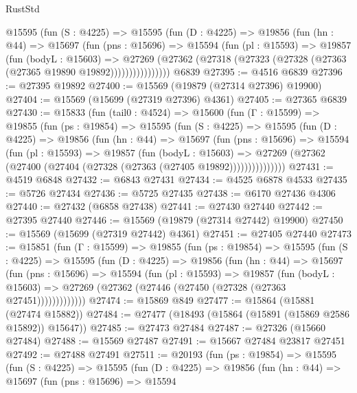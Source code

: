 \begin{lexlean}{RustStd}
\begin{coremodule}
          @15595
            (fun (S : @4225) =>
            @15595
              (fun (D : @4225) =>
              @19856
                (fun (hn : @44) =>
                @15697
                  (fun (pns : @15696) =>
                  @15594
                    (fun (pl : @15593) =>
                    @19857
                      (fun (bodyL : @15603) =>
                      @27269
                        (@27362
                          (@27318 (@27323 (@27328 (@27363 (@27365 @19890 @19892))))))))))))))))
    @6839
@27395 := @4516 @6839
@27396 := @27395 @19892
@27400 := @15569 (@19879 (@27314 @27396) @19900)
@27404 := @15569 (@15699 (@27319 @27396) @4361)
@27405 := @27365 @6839
@27430 := @15833
    (fun (tail0 : @4524) =>
    @15600
      (fun (Γ : @15599) =>
      @19855
        (fun (ps : @19854) =>
        @15595
          (fun (S : @4225) =>
          @15595
            (fun (D : @4225) =>
            @19856
              (fun (hn : @44) =>
              @15697
                (fun (pns : @15696) =>
                @15594
                  (fun (pl : @15593) =>
                  @19857
                    (fun (bodyL : @15603) =>
                    @27269 (@27362 (@27400 (@27404 (@27328 (@27363 (@27405 @19892)))))))))))))))
@27431 := @4519 @6848
@27432 := @6843 @27431
@27434 := @4525 @6878 @4533
@27435 := @5726 @27434
@27436 := @5725 @27435
@27438 := @6170 @27436 @4306
@27440 := @27432 (@6858 @27438)
@27441 := @27430 @27440
@27442 := @27395 @27440
@27446 := @15569 (@19879 (@27314 @27442) @19900)
@27450 := @15569 (@15699 (@27319 @27442) @4361)
@27451 := @27405 @27440
@27473 := @15851
    (fun (Γ : @15599) =>
    @19855
      (fun (ps : @19854) =>
      @15595
        (fun (S : @4225) =>
        @15595
          (fun (D : @4225) =>
          @19856
            (fun (hn : @44) =>
            @15697
              (fun (pns : @15696) =>
              @15594
                (fun (pl : @15593) =>
                @19857
                  (fun (bodyL : @15603) =>
                  @27269 (@27362 (@27446 (@27450 (@27328 (@27363 @27451)))))))))))))
@27474 := @15869 @849
@27477 := @15864 (@15881 (@27474 @15882))
@27484 := @27477 (@18493 (@15864 (@15891 (@15869 @2586 @15892)) @15647))
@27485 := @27473 @27484
@27487 := @27326 (@15660 @27484)
@27488 := @15569 @27487
@27491 := @15667 @27484 @23817 @27451
@27492 := @27488 @27491
@27511 := @20193
    (fun (ps : @19854) =>
    @15595
      (fun (S : @4225) =>
      @15595
        (fun (D : @4225) =>
        @19856
          (fun (hn : @44) =>
          @15697
            (fun (pns : @15696) =>
            @15594

\end{coremodule}
\end{lexlean}
